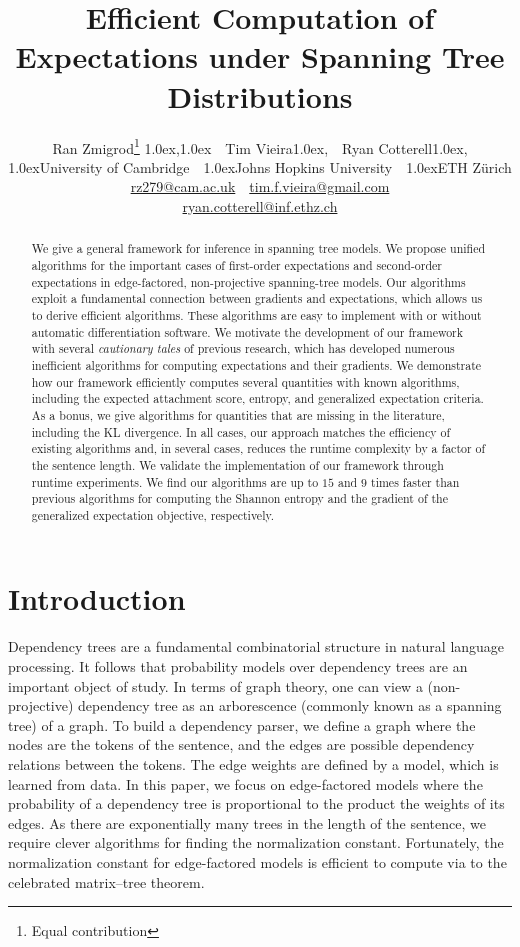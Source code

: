 \documentclass[11pt,a4paper]{article}
\title{Efficient Computation of Expectations under Spanning Tree Distributions}
\author{
{Ran Zmigrod\thanks{\quad Equal contribution}\hspace{7pt} \raise1.0ex\hbox{\normalfont,\ucambridge}\raise1.0ex\hbox{\normalfont}}~\;~Tim Vieira\footnotemark[1]\hspace{10pt}\raise1.0ex\hbox{\normalfont,\jhu}~\;~Ryan Cotterell\raise1.0ex\hbox{\normalfont\ucambridge,\ethz}
\\
  \raise1.0ex\hbox{\normalfont\ucambridge}University of Cambridge~\;~\raise1.0ex\hbox{\normalfont\jhu}Johns Hopkins University~\;~\raise1.0ex\hbox{\normalfont\ethz}ETH Z\"{u}rich \\
  \url{rz279@cam.ac.uk}~\;~\url{tim.f.vieira@gmail.com} \\ \url{ryan.cotterell@inf.ethz.ch}
}
\date{}
\newcommand{\ar}{arborescence\xspace}
\theoremstyle{definition}
\begin{document}
\maketitle

\begin{abstract}
We give a general framework for inference in spanning tree models.
We propose unified algorithms for the important cases of first-order expectations and second-order expectations in edge-factored, non-projective spanning-tree models. 
Our algorithms exploit a fundamental connection between gradients and expectations, which allows us to derive efficient algorithms.
These algorithms are easy to implement with or without automatic differentiation software.
We motivate the development of our framework with several \emph{cautionary tales} of previous research, which has developed numerous inefficient algorithms for computing expectations and their gradients.
We demonstrate how our framework efficiently computes several quantities with known algorithms, including the expected attachment score, entropy, and generalized expectation criteria.  
As a bonus, we give algorithms for quantities that are missing in the literature, including the KL divergence.
In all cases, our approach matches the efficiency of existing algorithms and, in several cases, reduces the runtime complexity by a factor of the sentence length.
We validate the implementation of our framework through runtime experiments.
We find our algorithms are up to $15$ and $9$ times faster than previous algorithms for computing the Shannon entropy and the gradient of the generalized expectation objective, respectively.
\end{abstract}

\section{Introduction}\label{sec:intro}
Dependency trees are a fundamental combinatorial structure in natural language processing.
It follows that probability models over dependency trees are an important object of study.
In terms of graph theory, one can view a (non-projective) dependency tree as an \ar{} (commonly known as a spanning tree) of a graph.  
To build a dependency parser, 
we define a graph where the nodes are the tokens of the sentence, 
and the edges are possible dependency relations between the tokens.
The edge weights are defined by a model, which is learned from data.
In this paper, we focus on edge-factored models 
where the probability of a dependency tree is proportional to the product the weights of its edges.  As there are exponentially many trees in the length of the sentence, 
we require clever algorithms for finding the normalization constant.
Fortunately, the normalization constant for edge-factored models is efficient to compute via to the celebrated matrix--tree theorem.
\end{document}
